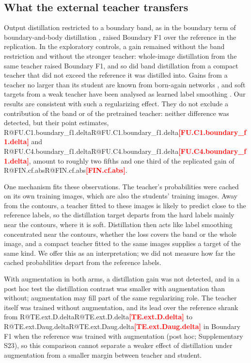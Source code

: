 \documentclass[fleqn,10pt,lineno]{wlpeerj}
\makeatletter
\newcommand{\R}[1]{\ifcsname R@#1\endcsname\csname R@#1\endcsname\else\textbf{\textcolor{red}{[#1]}}\fi}
\makeatother
\begin{document}
\subsection*{What the external teacher transfers}
Output distillation \citep{Hinton2015Distilling} restricted to a boundary band, as in the boundary term of boundary-and-body distillation \citep{Liu2024BPKD}, raised Boundary F1 over the reference in the replication. In the exploratory controls, a gain remained without the band restriction and without the stronger teacher: whole-image distillation from the same teacher raised Boundary F1, and so did band distillation from a compact teacher that did not exceed the reference it was distilled into. Gains from a teacher no larger than its student are known from born-again networks \citep{Furlanello2018Born}, and soft targets from a weak teacher have been analysed as learned label smoothing \citep{Yuan2020Revisiting}. Our results are consistent with such a regularizing effect. They do not exclude a contribution of the band or of the pretrained teacher: neither difference was detected, but their point estimates, \R{FU.C1.boundary_f1.delta} and \R{FU.C4.boundary_f1.delta}, amount to roughly two fifths and one third of the replicated gain of \R{FIN.cf.abs}.

One mechanism fits these observations. The teacher's probabilities were cached on its own training images, which are also the students' training images. Away from the contours, a teacher fitted to these images is likely to predict close to the reference labels, so the distillation target departs from the hard labels mainly near the contours, where it is soft. Distillation then acts like label smoothing concentrated near the contours, whether the loss covers the band or the whole image, and a compact teacher fitted to the same images supplies a target of the same kind. We offer this as an interpretation; we did not measure how far the cached probabilities depart from the reference labels.

With augmentation in both arms, a distillation gain was not detected, and in a post hoc test the distillation contrast was smaller with augmentation than without; augmentation may fill part of the same regularizing role. The teacher itself was trained without augmentation, and its lead over the reference shrank from \R{TE.ext.D.delta} to \R{TE.ext.Daug.delta} in Boundary F1 when the reference was trained with augmentation (post hoc; Supplementary S23), so this comparison cannot separate a weaker effect of distillation under augmentation from a smaller margin between teacher and student.
\end{document}
